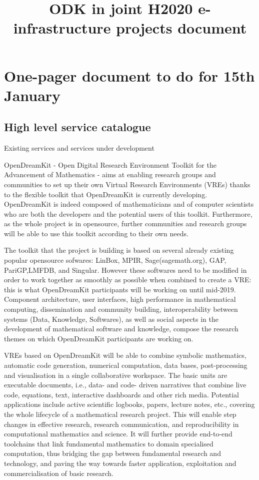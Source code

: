 \documentclass[12pt]{amsbook}
\title{ODK in joint H2020 e-infrastructure projects document}
\begin{document}
\maketitle

\section{One-pager document to do for 15th January}
\subsection{High level service catalogue}
Existing services and services under development


OpenDreamKit - Open Digital Research Environment Toolkit for the Advancement of Mathematics - aims at enabling research groups and communities to set up their own Virtual Research Environments (VREs) thanks to the flexible toolkit that OpenDreamKit is currently developing.
OpenDreamKit is indeed composed of mathematicians and of computer scientists who are both the developers and the potential users of this toolkit. Furthermore, as the whole project is in opensource, further communities and research groups will be able to use this toolkit according to their own needs.

The toolkit that the project is building is based on several already existing popular opensource sofwares: LinBox, MPIR, Sage(sagemath.org), GAP, PariGP,LMFDB, and
Singular.
However these softwares need to be modified in order to work together as smoothly as possible when combined to create a VRE: this is what OpenDreamKit participants will be working on until mid-2019. Component architecture, user interfaces, high performance in mathematical computing,  dissemination and community building,  interoperability between systems (Data, Knowledge, Softwares),  as well as social aspects in the development of mathematical software and knowledge, compose the research themes on which OpenDreamKit participants are working on.

VREs based on OpenDreamKit will be able to combine symbolic mathematics, automatic code generation, numerical computation, data bases, post-processing and visualisation in a single collaborative workspace. The basic units are executable documents, i.e., data- and code- driven narratives that combine live code, equations, text, interactive dashboards and other rich media. Potential applications include active scientific logbooks, papers, lecture notes, etc., covering the whole lifecycle of a mathematical research project.
This will enable step changes in effective research, research communication, and reproducibility in computational mathematics and science. It will further provide end-to-end toolchains that link fundamental mathematics to domain specialised computation, thus bridging the gap between fundamental research and technology, and paving the way towards faster application, exploitation and commercialisation of basic research.
\end{document}
